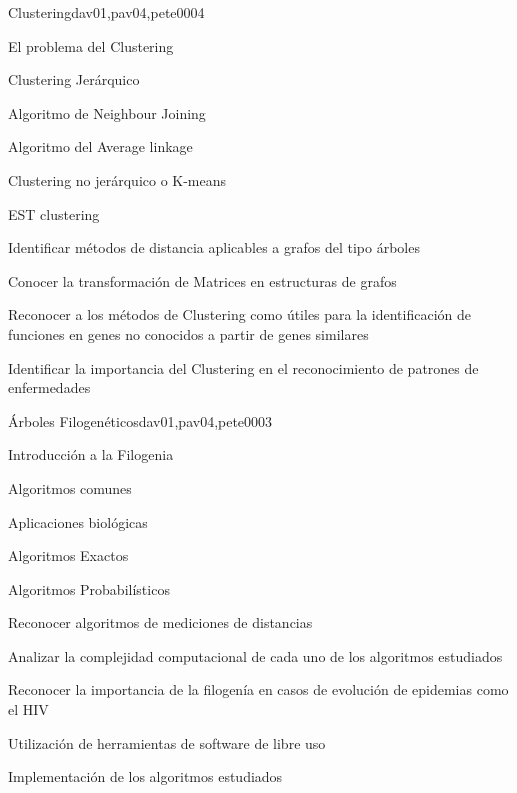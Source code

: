 \begin{syllabus}
\begin{unit}{Clustering}{dav01,pav04,pete00}{0}{4}
\begin{topics}
        \item El problema del Clustering
        \item Clustering Jerárquico
        \item Algoritmo de Neighbour Joining
        \item Algoritmo del Average linkage
        \item Clustering no jerárquico o K-means
        \item EST clustering
    \end{topics}
    \begin{unitgoals}
        \item Identificar métodos de distancia aplicables a grafos del tipo árboles
        \item Conocer la transformación de Matrices en estructuras de grafos
        \item Reconocer a los métodos de Clustering como útiles para la identificación de funciones en genes no conocidos a partir de genes similares
        \item Identificar la importancia del Clustering en el reconocimiento de patrones de enfermedades
    \end{unitgoals}
\end{unit}

\begin{unit}{Árboles Filogenéticos}{dav01,pav04,pete00}{0}{3}
\begin{topics}
        \item Introducción a la Filogenia
        \item Algoritmos comunes
        \item Aplicaciones biológicas
        \item Algoritmos Exactos
        \item Algoritmos Probabilísticos
    \end{topics}
    \begin{unitgoals}
        \item Reconocer algoritmos de mediciones de distancias
        \item Analizar la complejidad computacional de cada uno de los algoritmos estudiados
        \item Reconocer la importancia de la filogenía en casos de evolución de epidemias como el HIV
        \item Utilización de herramientas de software de libre uso
        \item Implementación de los algoritmos estudiados
    \end{unitgoals}
\end{unit}


\end{syllabus}
